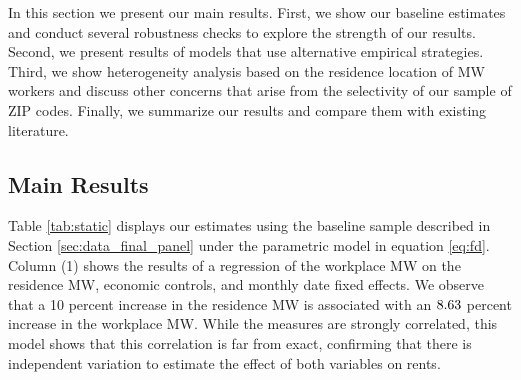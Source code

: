 
In this section we present our main results.
First, we show our baseline estimates and conduct several robustness checks to 
explore the strength of our results.
Second, we present results of models that use alternative empirical strategies.
Third, we show heterogeneity analysis based on the residence location of MW 
workers and discuss other concerns that arise from the selectivity of our 
sample of ZIP codes.
Finally, we summarize our results and compare them with existing literature.

\subsection{Main Results}
\label{sec:results_main}

Table \ref{tab:static} displays our estimates using the baseline sample 
described in Section \ref{sec:data_final_panel} under the parametric model
in equation \eqref{eq:fd}.
Column (1) shows the results of a regression of the workplace MW on the 
residence MW, economic controls, and monthly date fixed effects.
We observe that a 10 percent increase in the residence MW is associated with an
$\textnormal{8.63}$ percent increase in the workplace MW.
While the measures are strongly correlated, this model shows that this 
correlation is far from exact, confirming that there is independent variation
to estimate the effect of both variables on rents.

